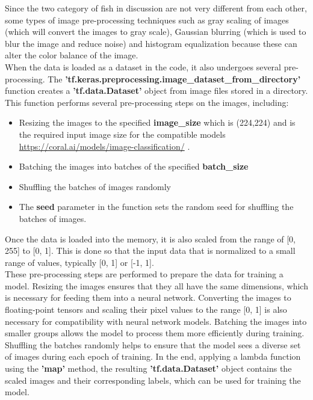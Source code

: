 Since the two category of fish in discussion are not very different from each other, some types of image pre-processing techniques such as gray scaling of images (which will convert the images to gray scale), Gaussian blurring  (which is used to blur the image and reduce noise) and histogram equalization because these can alter the color balance of the image.
\\
When the data is loaded as a dataset in the code, it also undergoes several pre-processing. The \textbf{'tf.keras.preprocessing.image\_dataset\_from\_directory'} function creates a \textbf{'tf.data.Dataset'} object from image files stored in a directory. This function performs several pre-processing steps on the images, including:
\begin{itemize}
    \item Resizing the images to the specified \textbf{image\_size} which is (224,224) and is the required input image size for the compatible models \url{https://coral.ai/models/image-classification/} \cite{coralModelsImage}. 
    \item Batching the images into batches of the specified \textbf{batch\_size}
    \item Shuffling the batches of images randomly
    \item The \textbf{seed} parameter in the function sets the random seed for shuffling the batches of images.
\end{itemize}
Once the data is loaded into the memory, it is also scaled from the range of [0, 255] to [0, 1]. This is done so that the input data that is normalized to a small range of values, typically [0, 1] or [-1, 1].
\\
These pre-processing steps are performed to prepare the data for training a model. Resizing the images ensures that they all have the same dimensions, which is necessary for feeding them into a neural network. Converting the images to floating-point tensors and scaling their pixel values to the range [0, 1] is also necessary for compatibility with neural network models. Batching the images into smaller groups allows the model to process them more efficiently during training. Shuffling the batches randomly helps to ensure that the model sees a diverse set of images during each epoch of training. In the end, applying a lambda function using the \textbf{'map'} method, the resulting \textbf{'tf.data.Dataset'} object contains the scaled images and their corresponding labels, which can be used for training the model.

